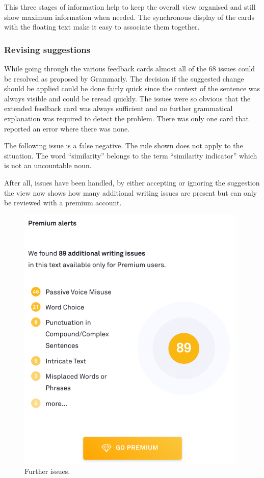 \documentclass[runningheads]{llncs}
\let\OldTextregistered\textregistered
\renewcommand{\textregistered}{\OldTextregistered\xspace}
\begin{document}
This three stages of information help to keep the overall view organised and still show maximum information when needed. The synchronous display of the cards with the floating text make it easy to associate them together. 

\subsubsection{Revising suggestions}
While going through the various feedback cards almost all of the 68 issues could be resolved as proposed by Grammarly\textregistered. The decision if the suggested change should be applied could be done fairly quick since the context of the sentence was always visible and could be reread quickly. The issues were so obvious that the extended feedback card was always sufficient and no further grammatical explanation was required to detect the problem. There was only one card that reported an error where there was none. 

The following issue is a false negative. The rule shown does not apply to the situation. The word ``similarity'' belongs to the term ``similarity indicator'' which is not an uncountable noun.


\noindent{}

After all, issues have been handled, by either accepting or ignoring the suggestion the view now shows how many additional writing issues are present but can only be reviewed with a premium account.

\begin{figure}[H]
  \includegraphics[width=0.8\linewidth]{images/premium.png}
  \caption{Further issues.}
  \label{fig:premium}
\end{figure}
\end{document}
